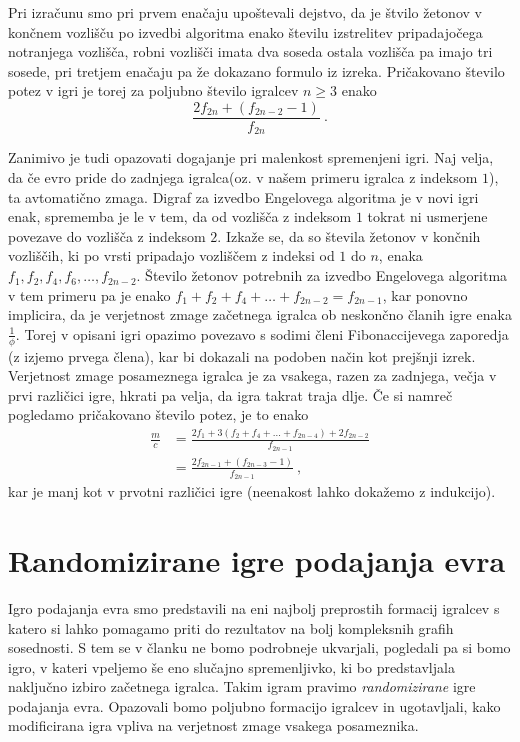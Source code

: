\documentclass[twoside,11pt]{article}
\begin{document}
Pri izračunu smo pri prvem enačaju upoštevali dejstvo, da je štvilo žetonov v končnem vozlišču po izvedbi algoritma enako številu izstrelitev pripadajočega notranjega vozlišča, robni vozlišči imata dva soseda ostala vozlišča pa imajo tri sosede, pri tretjem enačaju pa že dokazano formulo iz izreka.
Pričakovano število potez v igri je torej za poljubno število igralcev $n\ge3$ enako 
$$
\frac{2f_{2n} + (f_{2n-2}-1)}{f_{2n}} \ .
$$

Zanimivo je tudi opazovati dogajanje pri malenkost spremenjeni igri. Naj velja, da če evro pride 
do zadnjega igralca(oz. v našem primeru igralca z indeksom $1$), ta avtomatično zmaga. Digraf za izvedbo Engelovega algoritma je v novi igri enak, 
sprememba je le v tem, da od vozlišča z indeksom $1$ tokrat ni usmerjene povezave do vozlišča z indeksom $2$. 
Izkaže se, da so števila žetonov v končnih vozliščih, ki po vrsti pripadajo vozliščem z indeksi od $1$ 
do $n$, enaka $f_1,f_2,f_4,f_6,\ldots,f_{2n-2}$.
Število žetonov potrebnih za izvedbo Engelovega algoritma v tem primeru pa je enako $f_1+f_2+f_4+\ldots+f_{2n-2}=f_{2n-1}$, 
kar ponovno implicira, da je verjetnost zmage začetnega igralca ob neskončno članih igre enaka $\frac{1}{\phi}$. 
Torej v opisani igri opazimo povezavo s sodimi členi Fibonaccijevega zaporedja (z izjemo prvega člena), 
kar bi dokazali na podoben način kot prejšnji izrek.
Verjetnost zmage posameznega igralca je za vsakega, razen za zadnjega, večja v prvi različici igre, hkrati pa velja, da igra takrat traja dlje.
Če si namreč pogledamo pričakovano število potez, je to enako
\begin{align*}
    \frac{m}{c} &= \frac{2f_1 + 3(f_2+f_4+\ldots+f_{2n-4})+ 2f_{2n-2}}{f_{2n-1}} \\
    &= \frac{2f_{2n-1} + (f_{2n-3}-1)}{f_{2n-1}} \ ,
\end{align*}
kar je manj kot v prvotni različici igre (neenakost lahko dokažemo z indukcijo).

\section{Randomizirane igre podajanja evra}
Igro podajanja evra smo predstavili na eni najbolj preprostih formacij igralcev s katero si lahko pomagamo priti do rezultatov na bolj kompleksnih grafih sosednosti. 
S tem se v članku ne bomo podrobneje ukvarjali, pogledali pa si bomo igro, v kateri vpeljemo še eno slučajno spremenljivko, ki bo predstavljala naključno izbiro začetnega igralca. Takim
igram pravimo \emph{randomizirane} igre podajanja evra. Opazovali bomo poljubno formacijo igralcev in ugotavljali, kako modificirana igra vpliva na verjetnost zmage vsakega posameznika. 
\end{document}
